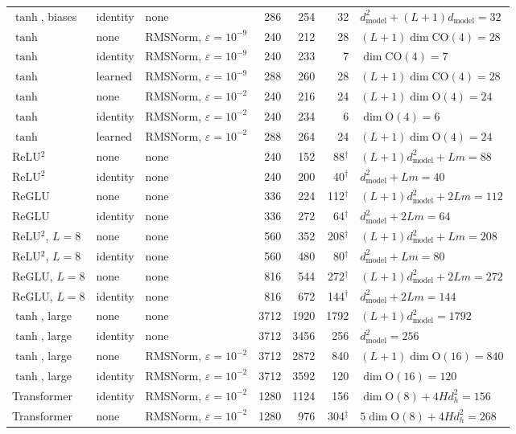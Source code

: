 \documentclass[10pt]{article}
\theoremstyle{definition}
\theoremstyle{remark}
\newcommand{\dm}{d_{\mathrm{model}}}
\newcommand{\Ort}{\mathrm{O}}
\newcommand{\CO}{\mathrm{CO}}
\begin{document}
\begin{table}[ht]
\begin{tabular}{@{}lllrrrl@{}}
$\tanh$, biases & identity & none & 286 & 254 & 32 & $\dm^2 + (L{+}1)\dm = 32$ \\
\addlinespace
$\tanh$ & none & RMSNorm, $\varepsilon = 10^{-9}$ & 240 & 212 & 28 & $(L{+}1)\dim\CO(4) = 28$ \\
$\tanh$ & identity & RMSNorm, $\varepsilon = 10^{-9}$ & 240 & 233 & 7 & $\dim\CO(4) = 7$ \\
$\tanh$ & learned & RMSNorm, $\varepsilon = 10^{-9}$ & 288 & 260 & 28 & $(L{+}1)\dim\CO(4) = 28$ \\
$\tanh$ & none & RMSNorm, $\varepsilon = 10^{-2}$ & 240 & 216 & 24 & $(L{+}1)\dim\Ort(4) = 24$ \\
$\tanh$ & identity & RMSNorm, $\varepsilon = 10^{-2}$ & 240 & 234 & 6 & $\dim\Ort(4) = 6$ \\
$\tanh$ & learned & RMSNorm, $\varepsilon = 10^{-2}$ & 288 & 264 & 24 & $(L{+}1)\dim\Ort(4) = 24$ \\
\addlinespace
ReLU$^2$ & none & none & 240 & 152 & 88$^\dagger$ & $(L{+}1)\dm^2 + Lm = 88$ \\
ReLU$^2$ & identity & none & 240 & 200 & 40$^\dagger$ & $\dm^2 + Lm = 40$ \\
ReGLU & none & none & 336 & 224 & 112$^\dagger$ & $(L{+}1)\dm^2 + 2Lm = 112$ \\
ReGLU & identity & none & 336 & 272 & 64$^\dagger$ & $\dm^2 + 2Lm = 64$ \\
ReLU$^2$, $L = 8$ & none & none & 560 & 352 & 208$^\dagger$ & $(L{+}1)\dm^2 + Lm = 208$ \\
ReLU$^2$, $L = 8$ & identity & none & 560 & 480 & 80$^\dagger$ & $\dm^2 + Lm = 80$ \\
ReGLU, $L = 8$ & none & none & 816 & 544 & 272$^\dagger$ & $(L{+}1)\dm^2 + 2Lm = 272$ \\
ReGLU, $L = 8$ & identity & none & 816 & 672 & 144$^\dagger$ & $\dm^2 + 2Lm = 144$ \\
\addlinespace
$\tanh$, large & none & none & 3712 & 1920 & 1792 & $(L{+}1)\dm^2 = 1792$ \\
$\tanh$, large & identity & none & 3712 & 3456 & 256 & $\dm^2 = 256$ \\
$\tanh$, large & none & RMSNorm, $\varepsilon = 10^{-2}$ & 3712 & 2872 & 840 & $(L{+}1)\dim\Ort(16) = 840$ \\
$\tanh$, large & identity & RMSNorm, $\varepsilon = 10^{-2}$ & 3712 & 3592 & 120 & $\dim\Ort(16) = 120$ \\
\addlinespace
Transformer & identity & RMSNorm, $\varepsilon = 10^{-2}$ & 1280 & 1124 & 156 & $\dim\Ort(8) + 4Hd_h^2 = 156$ \\
Transformer & none & RMSNorm, $\varepsilon = 10^{-2}$ & 1280 & 976 & 304$^\ddagger$ & $5\dim\Ort(8) + 4Hd_h^2 = 268$ \\
\bottomrule
\end{tabular}
\end{table}
\end{document}
